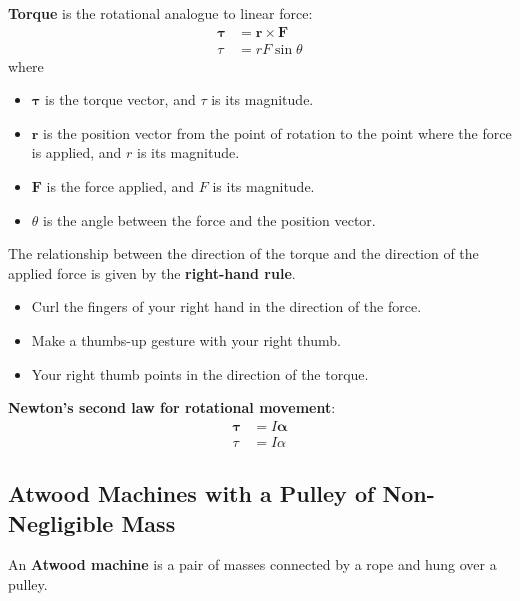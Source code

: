 \documentclass[a4paper, titlepage]{book}
\begin{document}
\textbf{Torque} is the rotational analogue to linear force:
\begin{equation}
    \begin{aligned}
        \bm{\tau} &= \bm{r} \times \bm{F} \\
        \tau &= r F \sin\theta
    \end{aligned}
\end{equation}
where
\begin{itemize}
    \item \(\bm{\tau}\) is the torque vector, and \(\tau\) is its magnitude.
    \item \(\bm{r}\) is the position vector from the point of rotation
          to the point where the force is applied, and \(r\) is its magnitude.
    \item \(\bm{F}\) is the force applied, and \(F\) is its magnitude.
    \item \(\theta\) is the angle between the force and the position vector.
\end{itemize}

The relationship between the direction of the torque
and the direction of the applied force is given by the \textbf{right-hand rule}.
\begin{itemize}
    \item Curl the fingers of your right hand in the direction of the force.
    \item Make a thumbs-up gesture with your right thumb.
    \item Your right thumb points in the direction of the torque.
\end{itemize}


\textbf{Newton's second law for rotational movement}:
\begin{equation} \label{eq:newtons-2nd-law-rotational}
    \begin{aligned}
        \bm{\tau} &= I \bm{\alpha} \\
        \tau &= I \alpha
    \end{aligned}
\end{equation}

\subsection{Atwood Machines with a Pulley of Non-Negligible Mass}

An \textbf{Atwood machine} is a pair of masses connected by a rope and hung over a pulley.
\end{document}
